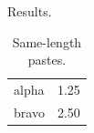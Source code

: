 \documentclass{article}
\begin{document}
Results.

\begin{table}[h]
\centering
\begin{tabular}{lr}
alpha & 1.25 \\
bravo & 2.50 \\
\end{tabular}
\caption{Same-length pastes.}
\end{table}
\end{document}

